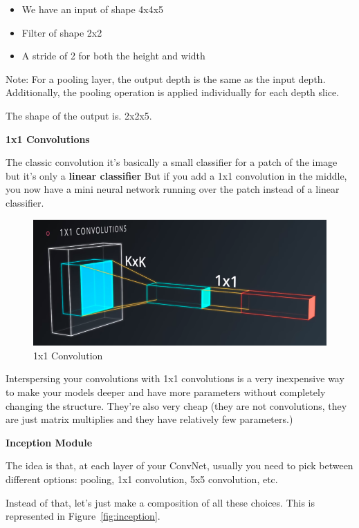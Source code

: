 \documentclass[11pt, a4paper]{article}
\begin{document}
\begin{itemize}
	\item We have an input of shape 4x4x5
	\item Filter of shape 2x2
	\item A stride of 2 for both the height and width
\end{itemize}

Note: For a pooling layer, the output depth is the same as the input depth. Additionally, the pooling operation is applied individually for each depth slice. 

The shape of the output is. 2x2x5.


\textbf{1x1 Convolutions}

The classic convolution it's basically a small classifier for a patch of the image but it's only a \textbf{linear classifier} But if you add a 1x1 convolution in the middle, you now have a mini neural network running over the patch instead of a linear classifier. 


\begin{figure}[htb!]
	\centering
	\includegraphics[width=0.8\linewidth]{1x1_conv}
	\caption{1x1 Convolution}
	\label{fig:1x1conv}
\end{figure}


Interspersing your convolutions with 1x1 convolutions is a very inexpensive way to make your models deeper and have more parameters without completely changing the structure. They're also very cheap (they are not convolutions, they are just matrix multiplies and they have relatively few parameters.) 


\textbf{Inception Module}

 The idea is that, at each layer of your ConvNet, usually you need to pick between different options: pooling, 1x1 convolution, 5x5 convolution, etc.

 Instead of that, let's just make a composition of all these choices. This is represented in Figure~\ref{fig:inception}.
\end{document}
